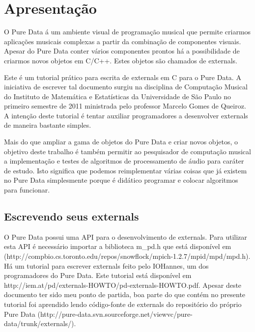 \documentclass[10pt,a4paper]{report}
\begin{document}
\tableofcontents

 
\chapter{Apresentação}

O Pure Data á um ambiente visual de programação musical que permite criarmos
aplicações musicais complexas a partir da combinação de componentes visuais.
Apesar do Pure Data conter vários componentes prontos há a possibilidade de
criarmos novos objetos em C/C++. Estes objetos são chamados de externals.

Este é um tutorial prático para escrita de externals em C para o Pure Data. A
iniciativa de escrever tal documento surgiu na disciplina de Computação
Musical do Instituto de Matemática e Estatísticas da Universidade de São Paulo
no primeiro semestre de 2011 ministrada pelo professor Marcelo Gomes de
Queiroz. A intenção deste tutorial é tentar auxiliar programadores a
desenvolver externals de maneira bastante simples.

Mais do que ampliar a gama de objetos do Pure Data e criar novos objetos, o objetivo deste trabalho é também permitir ao pesquisador de computação musical a implementação e testes de algoritmos de processamento de áudio para caráter de estudo. Isto significa que podemos reimplementar várias coisas que já existem no Pure Data simplesmente porque é didático programar e colocar algoritmos para funcionar.

\section{Escrevendo seus externals}

O Pure Data possui uma API para o desenvolvimento de externals. Para utilizar esta API é necessário importar a biblioteca m\_pd.h que está disponível em (http://compbio.cs.toronto.edu/repos/snowflock/mpich-1.2.7/mpid/mpd/mpd.h). Há um tutorial para escrever externals feito pelo IOHannes, um dos programadores do Pure Data. Este tutorial está disponível em http://iem.at/pd/externals-HOWTO/pd-externals-HOWTO.pdf. Apesar deste documento ter sido meu ponto de partida, boa parte do que contém no presente tutorial foi aprendido lendo código-fonte de externals do repositório do próprio Pure Data (http://pure-data.svn.sourceforge.net/viewvc/pure-data/trunk/externals/).
\end{document}
